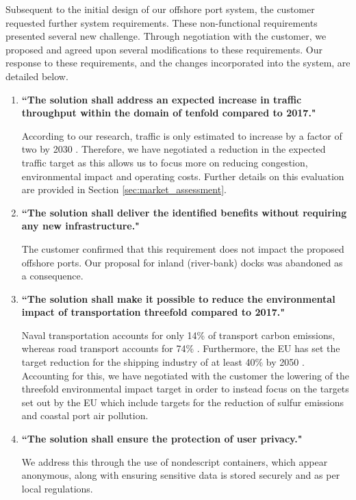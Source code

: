 Subsequent to the initial design of our offshore port system, the customer requested further system requirements. These non-functional requirements presented several new challenge. Through negotiation with the customer, we proposed and agreed upon several modifications to these requirements. Our response to these requirements, and the changes incorporated into the system, are detailed below.

\begin{enumerate}[label={\textbf{(\arabic*)}}, itemsep=3pt, topsep=4pt]
\item \textbf{``The solution shall address an expected increase in traffic throughput within the domain of tenfold compared to 2017."}

	According to our research, traffic is only estimated to increase by a factor of two by 2030 \cite{oecd}. Therefore, we have negotiated a reduction in the expected traffic target as this allows us to focus more on reducing congestion, environmental impact and operating costs. Further details on this evaluation are provided in Section \ref{sec:market_assessment}.
	
\item \textbf{``The solution shall deliver the identified benefits without requiring any new infrastructure."}

	The customer confirmed that this requirement does not impact the proposed offshore ports. Our proposal for inland (river-bank) docks was abandoned as a consequence.

\item \textbf{``The solution shall make it possible to reduce the environmental impact of transportation threefold compared to 2017."}

	Naval transportation accounts for only 14\% of transport carbon emissions, whereas road transport accounts for 74\% \cite{atag}. Furthermore, the EU has set the target reduction for the shipping industry of at least 40\% by 2050 \cite{eu-shipping}. Accounting for this, we have negotiated with the customer the lowering of the threefold environmental impact target in order to instead focus on the targets set out by the EU which include targets for the reduction of sulfur emissions and coastal port air pollution.

\item \textbf{``The solution shall ensure the protection of user privacy."}

	We address this through the use of nondescript containers, which appear anonymous, along with ensuring sensitive data is stored securely and as per local regulations.


\end{enumerate}
